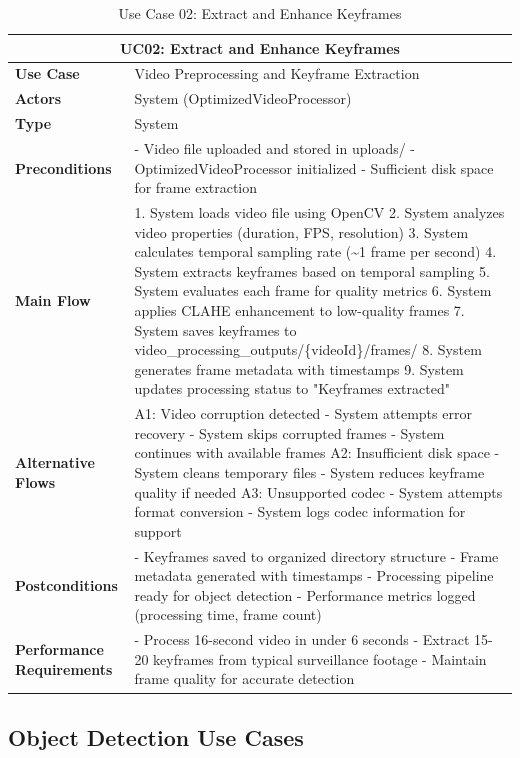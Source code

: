 \documentclass{article}
\begin{document}
\begin{table}[H]
\centering
\begin{tabularx}{\textwidth}{|l|X|}
\hline
\multicolumn{2}{|c|}{\textbf{UC02: Extract and Enhance Keyframes}} \\ \hline
\textbf{Use Case} & Video Preprocessing and Keyframe Extraction \\ \hline
\textbf{Actors} & System (OptimizedVideoProcessor) \\ \hline
\textbf{Type} & System \\ \hline
\textbf{Preconditions} & 
- Video file uploaded and stored in uploads/
- OptimizedVideoProcessor initialized
- Sufficient disk space for frame extraction \\ \hline
\textbf{Main Flow} & 
1. System loads video file using OpenCV
2. System analyzes video properties (duration, FPS, resolution)
3. System calculates temporal sampling rate (\~{}1 frame per second)
4. System extracts keyframes based on temporal sampling
5. System evaluates each frame for quality metrics
6. System applies CLAHE enhancement to low-quality frames
7. System saves keyframes to video\_processing\_outputs/\{videoId\}/frames/
8. System generates frame metadata with timestamps
9. System updates processing status to "Keyframes extracted" \\ \hline
\textbf{Alternative Flows} & 
A1: Video corruption detected
- System attempts error recovery
- System skips corrupted frames
- System continues with available frames
A2: Insufficient disk space
- System cleans temporary files
- System reduces keyframe quality if needed
A3: Unsupported codec
- System attempts format conversion
- System logs codec information for support \\ \hline
\textbf{Postconditions} & 
- Keyframes saved to organized directory structure
- Frame metadata generated with timestamps
- Processing pipeline ready for object detection
- Performance metrics logged (processing time, frame count) \\ \hline
\textbf{Performance Requirements} & 
- Process 16-second video in under 6 seconds
- Extract 15-20 keyframes from typical surveillance footage
- Maintain frame quality for accurate detection \\ \hline
\end{tabularx}
\caption{Use Case 02: Extract and Enhance Keyframes}
\end{table}

\subsection{Object Detection Use Cases}
\end{document}
